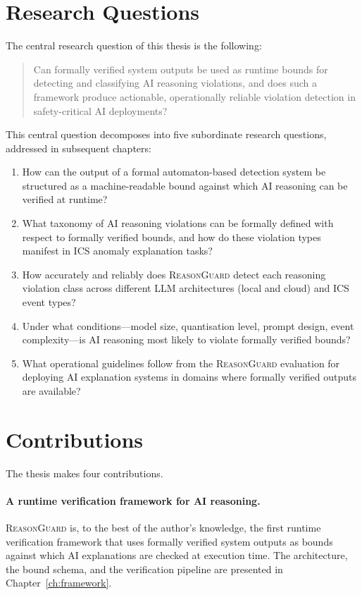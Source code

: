 \section{Research Questions}
\label{sec:research-questions}

The central research question of this thesis is the following:

\begin{quote}
  Can formally verified system outputs be used as runtime bounds for detecting and
  classifying AI reasoning violations, and does such a framework produce actionable,
  operationally reliable violation detection in safety-critical AI deployments?
\end{quote}

This central question decomposes into five subordinate research questions, addressed
in subsequent chapters:

\begin{enumerate}
  \item How can the output of a formal automaton-based detection system be structured
        as a machine-readable bound against which AI reasoning can be verified at
        runtime?
  \item What taxonomy of AI reasoning violations can be formally defined with respect
        to formally verified bounds, and how do these violation types manifest in ICS
        anomaly explanation tasks?
  \item How accurately and reliably does \textsc{ReasonGuard} detect each reasoning
        violation class across different LLM architectures (local and cloud) and ICS
        event types?
  \item Under what conditions---model size, quantisation level, prompt design, event
        complexity---is AI reasoning most likely to violate formally verified bounds?
  \item What operational guidelines follow from the \textsc{ReasonGuard} evaluation for
        deploying AI explanation systems in domains where formally verified outputs are
        available?
\end{enumerate}

\section{Contributions}
\label{sec:contributions}

The thesis makes four contributions.

\paragraph{A runtime verification framework for AI reasoning.}
\textsc{ReasonGuard} is, to the best of the author's knowledge, the first runtime
verification framework that uses formally verified system outputs as bounds against
which AI explanations are checked at execution time. The architecture, the bound
schema, and the verification pipeline are presented in Chapter~\ref{ch:framework}.

